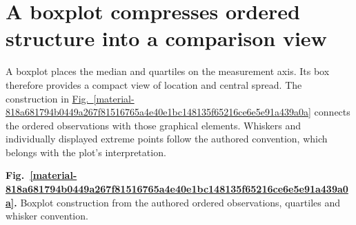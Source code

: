 \documentclass[11pt,a4paper]{article}
\begin{document}
\medskip

\clearpage
\section{A boxplot compresses ordered structure into a comparison view}
A boxplot places the median and quartiles on the measurement axis. Its box therefore provides a compact view of location and central spread. The construction in \hyperref[material-818a681794b0449a267f81516765a4e40e1bc148135f65216ce6e5e91a439a0a]{Fig.~\ref*{material-818a681794b0449a267f81516765a4e40e1bc148135f65216ce6e5e91a439a0a}} connects the ordered observations with those graphical elements. Whiskers and individually displayed extreme points follow the authored convention, which belongs with the plot's interpretation.


\par\medskip
\Needspace{10cm}
\label{material-818a681794b0449a267f81516765a4e40e1bc148135f65216ce6e5e91a439a0a}
\noindent\textbf{Fig.~\ref*{material-818a681794b0449a267f81516765a4e40e1bc148135f65216ce6e5e91a439a0a}.} Boxplot construction from the authored ordered observations, quartiles and whisker convention.\par\nopagebreak
\begin{center}
\end{center}

\medskip
\end{document}
